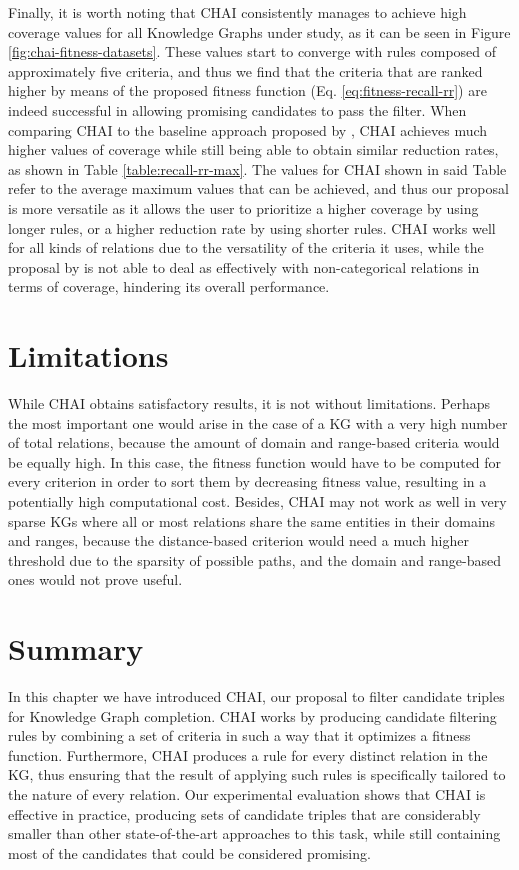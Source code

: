 Finally, it is worth noting that CHAI consistently manages to achieve high coverage values for all Knowledge Graphs under study, as it can be seen in Figure \ref{fig:chai-fitness-datasets}. These values start to converge with rules composed of approximately five criteria, and thus we find that the criteria that are ranked higher by means of the proposed fitness function (Eq. \ref{eq:fitness-recall-rr}) are indeed successful in allowing promising candidates to pass the filter. When comparing CHAI to the baseline approach proposed by \citet{shi18}, CHAI achieves much higher values of coverage while still being able to obtain similar reduction rates, as shown in Table \ref{table:recall-rr-max}. The values for CHAI shown in said Table refer to the average maximum values that can be achieved, and thus our proposal is more versatile as it allows the user to prioritize a higher coverage by using longer rules, or a higher reduction rate by using shorter rules. CHAI works well for all kinds of relations due to the versatility of the criteria it uses, while the proposal by \citet{shi18} is not able to deal as effectively with non-categorical relations in terms of coverage, hindering its overall performance.


\section{Limitations}\label{sec:chai-limitations}
While CHAI obtains satisfactory results, it is not without limitations. Perhaps the most important one would arise in the case of a KG with a very high number of total relations, because the amount of domain and range-based criteria would be equally high. In this case, the fitness function would have to be computed for every criterion in order to sort them by decreasing fitness value, resulting in a potentially high computational cost. Besides, CHAI may not work as well in very sparse KGs where all or most relations share the same entities in their domains and ranges, because the distance-based criterion would need a much higher threshold due to the sparsity of possible paths, and the domain and range-based ones would not prove useful.

\section{Summary}\label{sec:chai-summary}
In this chapter we have introduced CHAI, our proposal to filter candidate triples for Knowledge Graph completion. CHAI works by producing candidate filtering rules by combining a set of criteria in such a way that it optimizes a fitness function. Furthermore, CHAI produces a rule for every distinct relation in the KG, thus ensuring that the result of applying such rules is specifically tailored to the nature of every relation. Our experimental evaluation shows that CHAI is effective in practice, producing sets of candidate triples that are considerably smaller than other state-of-the-art approaches to this task, while still containing most of the candidates that could be considered promising.